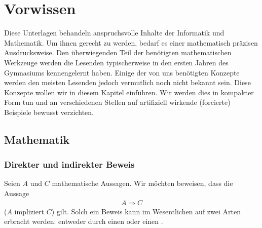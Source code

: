 \chapter{Vorwissen}\label{ch:Kapitel00}
Diese Unterlagen behandeln anspruchsvolle Inhalte der Informatik und Mathematik. Um ihnen gerecht zu werden, bedarf es einer mathematisch präzisen Ausdrucksweise. Den überwiegenden Teil der benötigten mathematischen Werkzeuge werden die Lesenden typischerweise in den ersten Jahren des Gymnasiums kennengelernt haben. Einige der von uns benötigten Konzepte werden den meisten Lesenden jedoch vermutlich noch nicht bekannt sein. Diese Konzepte wollen wir in diesem Kapitel einführen. Wir werden dies in kompakter Form tun und an verschiedenen Stellen auf artifiziell wirkende (forcierte) Beispiele bewusst verzichten.

\section{Mathematik}
\subsection{Direkter und indirekter Beweis}
Seien $A$ und $C$ mathematische Aussagen. Wir möchten beweisen, dass die Aussage
\begin{align*}
    A\Rightarrow C
\end{align*}
($A$ impliziert $C$) gilt. Solch ein Beweis kann im Wesentlichen auf zwei Arten erbracht werden: entweder durch einen  oder einen .

